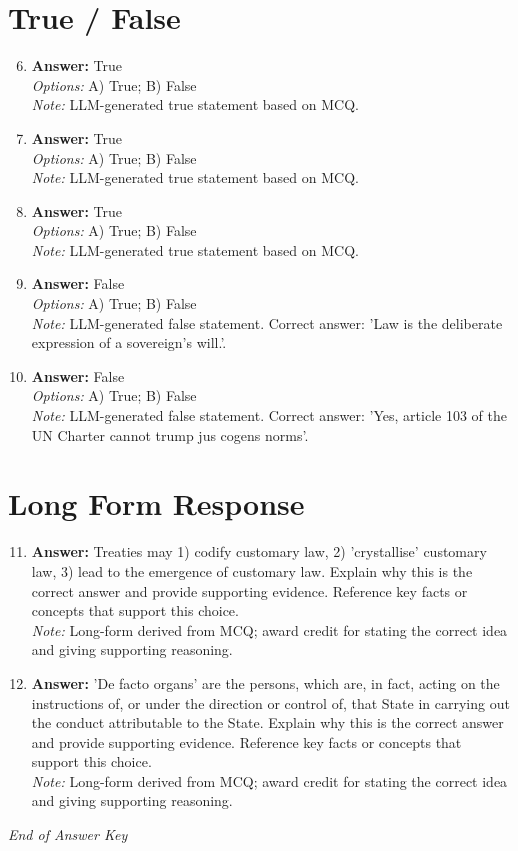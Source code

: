 \documentclass[12pt]{article}
\begin{document}
\section*{True / False}
\begin{enumerate}[label=\arabic*.]
\setcounter{enumi}{5}
\item \textbf{Answer:} True
\\ \textit{Options:} A) True; B) False
\\ \textit{Note:} LLM-generated true statement based on MCQ.
\item \textbf{Answer:} True
\\ \textit{Options:} A) True; B) False
\\ \textit{Note:} LLM-generated true statement based on MCQ.
\item \textbf{Answer:} True
\\ \textit{Options:} A) True; B) False
\\ \textit{Note:} LLM-generated true statement based on MCQ.
\item \textbf{Answer:} False
\\ \textit{Options:} A) True; B) False
\\ \textit{Note:} LLM-generated false statement. Correct answer: 'Law is the deliberate expression of a sovereign's will.'.
\item \textbf{Answer:} False
\\ \textit{Options:} A) True; B) False
\\ \textit{Note:} LLM-generated false statement. Correct answer: 'Yes, article 103 of the UN Charter cannot trump jus cogens norms'.
\end{enumerate}

\section*{Long Form Response}
\begin{enumerate}[label=\arabic*.]
\setcounter{enumi}{10}
\item \textbf{Answer:} Treaties may 1) codify customary law, 2) 'crystallise' customary law, 3) lead to the emergence of customary law. Explain why this is the correct answer and provide supporting evidence. Reference key facts or concepts that support this choice.
\\ \textit{Note:} Long-form derived from MCQ; award credit for stating the correct idea and giving supporting reasoning.
\item \textbf{Answer:} 'De facto organs' are the persons, which are, in fact, acting on the instructions of, or under the direction or control of, that State in carrying out the conduct attributable to the State. Explain why this is the correct answer and provide supporting evidence. Reference key facts or concepts that support this choice.
\\ \textit{Note:} Long-form derived from MCQ; award credit for stating the correct idea and giving supporting reasoning.
\end{enumerate}

\vfill
\noindent\textit{End of Answer Key}
\end{document}
